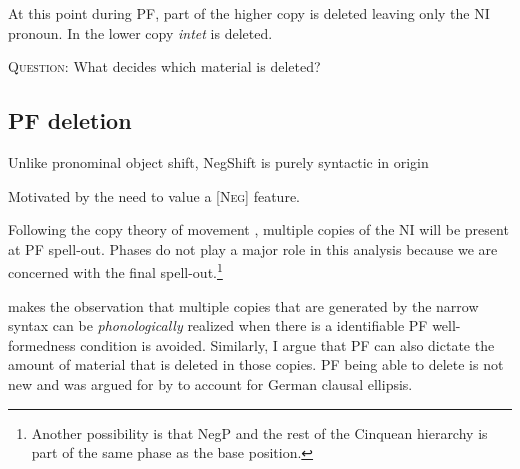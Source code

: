 \documentclass[12pt, letterpaper]{article}
\begin{document}
\ex At this point during PF, part of the higher copy is deleted leaving only the NI pronoun. In the lower copy \emph{intet} is deleted.\\
\label{ex:tree}

\z 

\begin{tcolorbox}[width=\linewidth]
\textsc{Question:} What decides which material is deleted?

\end{tcolorbox}

\subsection{PF deletion} \label{sec:PFDeletion}
\ea  Unlike pronominal object shift, NegShift is purely syntactic in origin

	\ea Motivated by the need to value a [\textsc{Neg}] feature. 
	\z

\ex Following the copy theory of movement \citet{chomskyMinimalistProgram2015}, multiple copies of the NI will be present at PF spell-out. 
	\ea Phases do not play a major role in this analysis because we are concerned with the final spell-out.\footnote{Another possibility is that NegP and the rest of the Cinquean hierarchy \citep{cinqueAdverbsFunctionalHeads1999} is part of the same phase as the base position.}
	\z 

\ex \citet{kandybowiczGrammarRepetitionNupe2008} makes the observation that multiple copies that are generated by the narrow syntax can be \emph{phonologically} realized when there is a identifiable PF well-formedness condition is avoided. 
	\ea Similarly, I argue that PF can also dictate the amount of material that is deleted in those copies. 
	\ex PF being able to delete is not new and was argued for by \citet{ottDeletionClausalEllipsis2016} to account for German clausal ellipsis. 
	\z 
\end{document}
